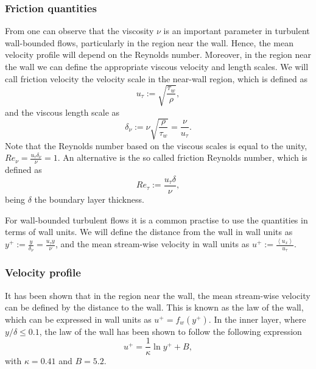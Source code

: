 \subsubsection{Friction quantities}
From  one can observe that the viscosity $ \nu $ is an important parameter in turbulent wall-bounded flows, particularly in the region near the wall. Hence, the mean velocity profile  will depend on the Reynolds number. Moreover, in the region near the wall we can define the appropriate viscous velocity and length scales. We will call friction velocity the velocity scale in the near-wall region, which is defined as
\begin{equation}
\label{eq-friction_velocity}
u_\tau:=\sqrt{\frac{\tau_w}{\rho}},
\end{equation}
and the viscous length scale as 
\begin{equation}
\label{eq-viscous_lenghtscale}
\delta_\nu:=\nu\sqrt{\frac{\rho}{\tau_w}}=\frac{\nu}{u_\tau}.
\end{equation}
Note that the Reynolds number based on the viscous scales is equal to the unity, $ Re_\nu = \frac{u_\tau\delta_\nu}{\nu}=1 $. An alternative is the so called friction Reynolds number, which is defined as
\begin{equation}
\label{eq-friction_reynolds}
Re_\tau:=\frac{u_\tau\delta}{\nu},
\end{equation}
being $ \delta $ the boundary layer thickness. 

For wall-bounded turbulent flows it is a common practise to use the quantities in terms of wall units. We will define the distance from the wall in wall units as $ y^+:=\frac{y}{\delta_\nu}=\frac{u_\tau y}{\nu} $, and the mean stream-wise velocity in wall units as $ u^+:=\frac{\left\langle u_x\right\rangle}{u_\tau} $.

\subsubsection{Velocity profile}
It has been shown that in the region near the wall, the mean stream-wise velocity can be defined by the distance to the wall. This is known as the law of the wall, which can be expressed in wall units as $ u^+=f_w(y^+) $. In the inner layer, where $ y/\delta\le0.1 $, the law of the wall has been shown to follow the following expression
\begin{equation}
\label{eq-wall_law}
u^+=\frac{1}{\kappa}\ln y^++B,
\end{equation}
with $ \kappa=0.41 $ and $ B=5.2 $.

